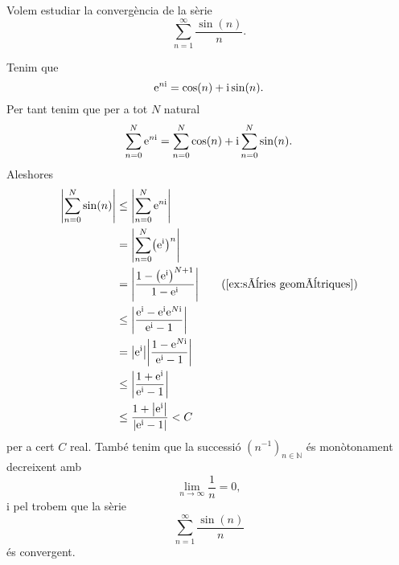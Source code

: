 \documentclass[../../Main.tex]{subfiles}
\begin{document}
	\begin{example}%
		\label{ex:Teorema de Dirichlet per sèries numèriques}
		Volem estudiar la convergència de la sèrie
		\[\sum_{n=1}^{\infty}\frac{\sin(n)}{n}.\]
		\begin{solution} %
			Tenim que
			\[\mathrm{e}^{n\mathrm{i}}=\cos(n)+\mathrm{i}\sin(n).\]
			Per tant tenim que per a tot \(N\) natural
			\[\sum_{n=0}^{N}\mathrm{e}^{n\mathrm{i}}=\sum_{n=0}^{N}\cos(n)+\mathrm{i}\sum_{n=0}^{N}\sin(n).\]
			Aleshores
			\begin{align*}
				\abs{\sum_{n=0}^{N}\sin(n)}&\leq\abs{\sum_{n=0}^{N}\e^{n\iu}} \\
				&=\abs{\sum_{n=0}^{N}\left(\e^{\iu}\right)^{n}} \\
				&=\abs{\frac{1-\left(\e^{\iu}\right)^{N+1}}{1-\e^{\iu}}} \tag{\ref{ex:sèries geomètriques}}\\
				&\leq\abs{\frac{\e^{\iu}-\e^{\iu}\e^{N\iu}}{\e^{\iu}-1}} \\
				&=\abs{\e^{\iu}}\abs{\frac{1-\e^{N\iu}}{\e^{\iu}-1}} \\
				&\leq\abs{\frac{1+\e^{\iu}}{\e^{\iu}-1}} \\
				&\leq\frac{1+\abs{\e^{\iu}}}{\abs{\e^{\iu}-1}}<C \\
			\end{align*}
			per a cert \(C\) real. També tenim que la successió \((n^{-1})_{n\in\mathbb{N}}\) és monòtonament decreixent amb
			\[\lim_{n\to\infty}\frac{1}{n}=0,\]
			i pel  trobem que la sèrie
			\[\sum_{n=1}^{\infty}\frac{\sin(n)}{n}\]
			és convergent.
		\end{solution} %
	\end{example}
\end{document}
